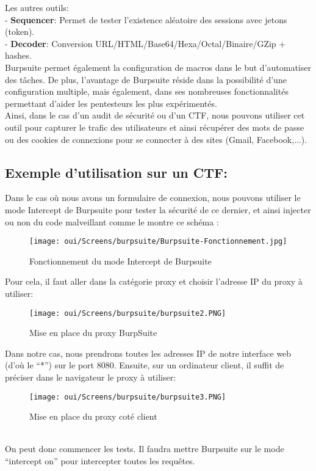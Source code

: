 \noindent Les autres outils:\\
- \textbf{Sequencer}: Permet de  tester l'existence aléatoire des sessions avec jetons (token).\\
- \textbf{Decoder}: Conversion URL/HTML/Base64/Hexa/Octal/Binaire/GZip + hashes.\\

Burpsuite permet également la configuration de macros dans le but d’automatiser des tâches. De plus, l’avantage de Burpsuite réside dans la possibilité d’une configuration multiple, mais également, dans ses nombreuses fonctionnalités permettant d’aider les pentesteurs les plus expérimentés.\\

Ainsi, dans le cas d’un audit de sécurité ou d’un CTF, nous pouvons utiliser cet outil pour capturer le trafic des utilisateurs et ainsi récupérer des mots de passe ou des cookies de connexions pour se connecter à des sites (Gmail, Facebook,...).\\

\subsection{Exemple d’utilisation sur un CTF:}

\noindent Dans le cas où nous avons un formulaire de connexion, nous pouvons utiliser le mode Intercept de Burpsuite pour tester la sécurité de ce dernier, et ainsi injecter ou non du code malveillant comme le montre ce schéma :

\begin{figure}[htp!]
  \centering
  \setlength\figureheight{7cm}
  \setlength\figurewidth{9cm}
  \texttt{[image: oui/Screens/burpsuite/Burpsuite-Fonctionnement.jpg]}
  \caption{Fonctionnement du mode Intercept de Burpsuite}
  \label{fig:courbe-tikz}
\end{figure}

\newpage
\noindent Pour cela, il faut aller dans la catégorie proxy et choisir l’adresse IP du proxy à utiliser:

\begin{figure}[htp!]
  \centering
  \setlength\figureheight{7cm}
  \setlength\figurewidth{9cm}
  \texttt{[image: oui/Screens/burpsuite/burpsuite2.PNG]}
  \caption{Mise en place du proxy BurpSuite}
  \label{fig:courbe-tikz}
\end{figure}
Dans notre cas, nous prendrons toutes les adresses IP de notre interface web (d’où le “*”) sur le port 8080. Ensuite, sur un ordinateur client, il suffit de préciser dans le navigateur le proxy à utiliser:
\begin{figure}[htp!]
  \centering
  \setlength\figureheight{7cm}
  \setlength\figurewidth{9cm}
  \texttt{[image: oui/Screens/burpsuite/burpsuite3.PNG]}
  \caption{Mise en place du proxy coté client}
  \label{fig:courbe-tikz}
\end{figure}\\
On peut donc commencer les tests. Il faudra mettre Burpsuite sur le mode “intercept on” pour intercepter toutes les requêtes.\\

